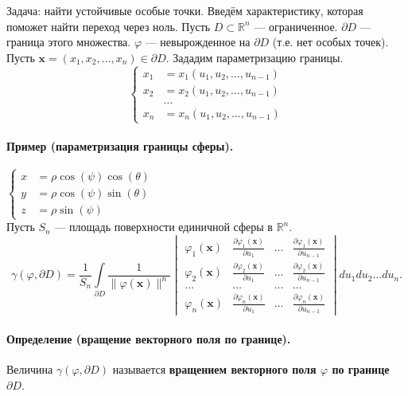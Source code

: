 Задача: найти устойчивые особые точки.
Введём характеристику, которая поможет найти переход через ноль.
Пусть $D \subset \mathbb{R}^n$ --- ограниченное. $\partial D$ --- граница этого множества. $\varphi$ --- невырожденное на $\partial D$ (т.е. нет особых точек).
Пусть $\mathbf{x}=(x_1,x_2,\hdots,x_n) \in \partial D$. Зададим параметризацию границы.
\[
	\left\{
	\begin{aligned}
		x_1 & = x_1(u_1, u_2, \dots, u_{n-1}) \\
		x_2 & = x_2(u_1, u_2, \dots, u_{n-1}) \\
		    & \hdots                          \\
		x_n & = x_n(u_1, u_2, \dots, u_{n-1}) 
	\end{aligned}
	\right.
\]
\paragraph{Пример (параметризация границы сферы).} $\left\{
\begin{aligned}
	x & = \rho \cos(\psi) \cos(\theta) \\
	y & = \rho \cos(\psi) \sin(\theta) \\
	z & = \rho \sin(\psi)              
\end{aligned}
\right.$
\\

Пусть $S_n$ --- площадь поверхности единичной сферы в $\mathbb{R}^n$.
\[
	\gamma(\varphi, \partial D) = \frac{1}{S_n} \int\limits_{\partial D} \frac{1}{\|\varphi(\mathbf{x})\|^n} \begin{vmatrix} \varphi_1(\mathbf{x}) & \frac{\partial \varphi_1(\mathbf{x})}{\partial u_1}  &\hdots & \frac{\partial \varphi_1(\mathbf{x})}{\partial u_{n-1}} \\ \varphi_2(\mathbf{x}) & \frac{\partial \varphi_2(\mathbf{x})}{\partial u_1}  &\hdots & \frac{\partial \varphi_2(\mathbf{x})}{\partial u_{n-1}} \\ \hdots & \hdots & \hdots & \hdots \\ \varphi_n(\mathbf{x}) & \frac{\partial \varphi_n(\mathbf{x})}{\partial u_1}  &\hdots & \frac{\partial \varphi_n(\mathbf{x})}{\partial u_{n-1}} \end{vmatrix} du_1du_2\hdots du_n.
\]
\paragraph{Определение (вращение векторного поля по границе).} Величина $\gamma(\varphi, \partial D)$ называется \textbf{вращением векторного поля $\varphi$ по границе $\partial D$}.
